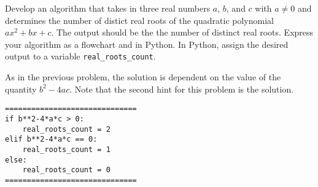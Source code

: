 \documentclass{ximera}
\begin{document}
\begin{question}
	Develop an algorithm that takes in three real numbers $a$, $b$, and $c$ with $a\neq 0$ and determines the number of distict real roots of the quadratic polynomial $ax^2+bx+c$. The output should be the the number of distinct real roots. Express your algorithm as a flowchart and in Python. In Python, assign the desired output to a variable \verb|real_roots_count|.
	\begin{hint}
	As in the previous problem, the solution is dependent on the value of the quantity $b^2-4ac$. Note that the second hint for this problem is the solution.
	\end{hint}
	\begin{hint}
            \begin{center}
           \end{center}
\begin{verbatim}
==============================
if b**2-4*a*c > 0:
	real_roots_count = 2
elif b**2-4*a*c == 0:
	real_roots_count = 1
else:
	real_roots_count = 0
==============================
\end{verbatim}
	\end{hint}
\end{question}
\end{document}
